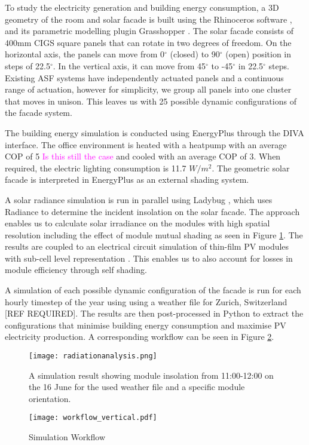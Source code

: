 
To study the electricity generation and building energy consumption, a 3D geometry of the room and solar facade is built using the Rhinoceros software \cite{Rhino}, and its parametric modelling plugin Grasshopper \cite{grasshopper}. The solar facade consists of 400mm CIGS square panels that can rotate in two degrees of freedom. On the horizontal axis, the panels can move from 0$^{\circ}$ (closed) to 90$^{\circ}$ (open) position in steps of 22.5$^{\circ}$. In the vertical axis, it can move from 45$^{\circ}$ to -45$^{\circ}$ in 22.5$^{\circ}$ steps. Existing ASF systems \cite{nagy2015frontiers} have independently actuated panels and a continuous range of actuation, however for simplicity, we group all panels into one cluster that moves in unison. This leaves us with 25 possible dynamic configurations of the facade system. 

The building energy simulation is conducted using EnergyPlus \cite{energyplus} through the DIVA \cite{DIVA} interface. The office environment is heated with a heatpump with an average COP of 5 \textcolor{magenta}{Is this still the case} and cooled with an average COP of 3. When required, the electric lighting consumption is 11.7 $W/m^2$.  The geometric solar facade is interpreted in EnergyPlus as an external shading system. 

A solar radiance simulation is run in parallel using Ladybug \cite{roudsari2014ladybug},  which uses Radiance \cite{ward1994radiance} to determine the incident insolation on the solar facade. The approach enables us to calculate solar irradiance on the modules with high spatial resolution including the effect of module mutual shading as seen in Figure \ref{fig:radiation}. The results are coupled to an electrical circuit simulation of thin-film PV modules with sub-cell level representation \cite{hofer2015PVSEC}. This enables us to also account for losses in module efficiency through self shading.

A simulation of each possible dynamic configuration of the facade is run for each hourly timestep of the year using using a weather file for Zurich, Switzerland [REF REQUIRED]. The results are then post-processed in Python \cite{python} to extract the configurations that minimise building energy consumption and maximise PV electricity production. A corresponding workflow can be seen in Figure \ref{fig:workflow}. 



\begin{figure}[H]
\begin{center}
\texttt{[image: radiationanalysis.png]}
\caption{A simulation result showing module insolation from 11:00-12:00 on the 16 June for the used weather file and a specific module orientation.}
\label{fig:radiation}
\end{center}
\end{figure}


\begin{figure}
\begin{center}
\texttt{[image: workflow\_vertical.pdf]}
\caption{Simulation Workflow}
\label{fig:workflow}
\end{center}
\end{figure}
